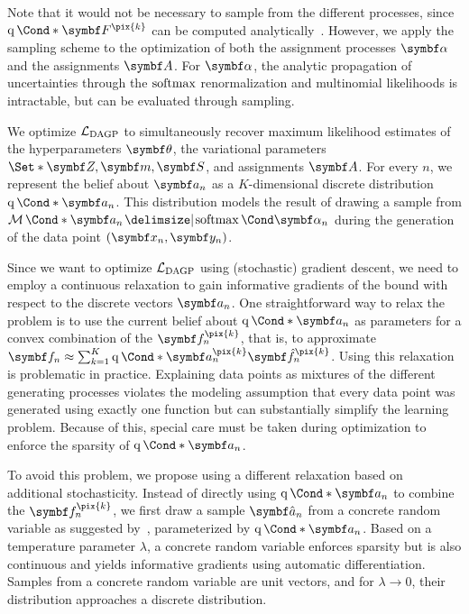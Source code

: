 Note that it would not be necessary to sample from the different processes, since $\Variat*{\mat{F}^{\pix{k}}}$ can be computed analytically~\parencite{hensman_gaussian_2013}.
However, we apply the sampling scheme to the optimization of both the assignment processes $\mat{\alpha}$ and the assignments $\mat{A}$.
For $\mat{\alpha}$, the analytic propagation of uncertainties through the $\operatorname{softmax}$ renormalization and multinomial likelihoods is intractable, but can be evaluated through sampling.

We optimize $\mathcal{L}_{\text{DAGP}}$ to simultaneously recover maximum likelihood estimates of the hyperparameters $\mat{\theta}$, the variational parameters $\Set*{\mat{Z}, \mat{m}, \mat{S}}$, and assignments $\mat{A}$.
For every $n$, we represent the belief about $\mat{a}_n$ as a $K$-dimensional discrete distribution $\Variat*{\mat{a}_n}$.
This distribution models the result of drawing a sample from $\Multinomial*{\mat{a}_n \given \Fun{\softmax}{\mat{\alpha}_n}}$ during the generation of the data point $(\mat{x}_n, \mat{y}_n)$.

Since we want to optimize $\mathcal{L}_{\text{DAGP}}$ using (stochastic) gradient descent, we need to employ a continuous relaxation to gain informative gradients of the bound with respect to the discrete vectors $\mat{a}_n$.
One straightforward way to relax the problem is to use the current belief about $\Variat*{\mat{a}_n}$ as parameters for a convex combination of the $\mat{f}_n^{\pix{k}}$, that is, to approximate $\mat{f}_n \approx \sum_{k=1}^K \Variat*{\mat{a}_n^{\pix{k}}}\mat{\hat{f}}_n^{\pix{k}}$.
Using this relaxation is problematic in practice.
Explaining data points as mixtures of the different generating processes violates the modeling assumption that every data point was generated using exactly one function but can substantially simplify the learning problem.
Because of this, special care must be taken during optimization to enforce the sparsity of $\Variat*{\mat{a}_n}$.

To avoid this problem, we propose using a different relaxation based on additional stochasticity.
Instead of directly using $\Variat*{\mat{a}_n}$ to combine the $\mat{f}_n^{\pix{k}}$, we first draw a sample $\mat{\hat{a}_n}$ from a concrete random variable as suggested by~\textcite{maddison_concrete_2016}, parameterized by $\Variat*{\mat{a}_n}$.
Based on a temperature parameter $\lambda$, a concrete random variable enforces sparsity but is also continuous and yields informative gradients using automatic differentiation.
Samples from a concrete random variable are unit vectors, and for $\lambda \to 0$, their distribution approaches a discrete distribution.

